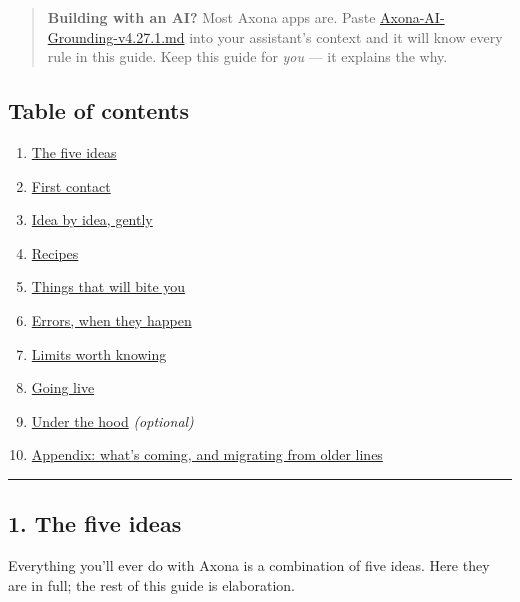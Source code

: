 \documentclass[
  nobib]{tufte-handout}
\providecommand{\tightlist}{%
  \setlength{\itemsep}{0pt}\setlength{\parskip}{0pt}}
\begin{document}
\begin{quote}
\textbf{Building with an AI?} Most Axona apps are. Paste
\url{Axona-AI-Grounding-v4.27.1.md} into your assistant's context and it
will know every rule in this guide. Keep this guide for \emph{you} ---
it explains the why.
\end{quote}

\subsection{Table of contents}\label{table-of-contents}

\begin{enumerate}
\def\labelenumi{\arabic{enumi}.}
\tightlist
\item
  \hyperref[1-the-five-ideas]{The five ideas}
\item
  \hyperref[2-first-contact]{First contact}
\item
  \hyperref[3-idea-by-idea-gently]{Idea by idea, gently}
\item
  \hyperref[4-recipes]{Recipes}
\item
  \hyperref[5-things-that-will-bite-you]{Things that will bite you}
\item
  \hyperref[6-errors-when-they-happen]{Errors, when they happen}
\item
  \hyperref[7-limits-worth-knowing]{Limits worth knowing}
\item
  \hyperref[8-going-live]{Going live}
\item
  \hyperref[9-under-the-hood--optional]{Under the hood}
  \emph{(optional)}
\item
  \hyperref[10-appendix]{Appendix: what's coming, and migrating from
  older lines}
\end{enumerate}

\begin{center}\rule{0.5\linewidth}{0.5pt}\end{center}

\subsection{1. The five ideas}\label{the-five-ideas}

Everything you'll ever do with Axona is a combination of five ideas.
Here they are in full; the rest of this guide is elaboration.
\end{document}
